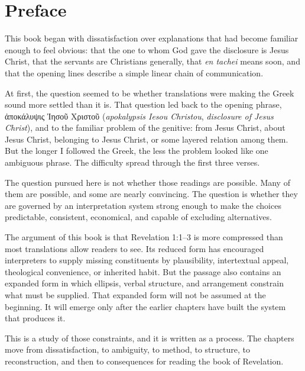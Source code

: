 \chapter{Preface}

This book began with dissatisfaction over explanations that had become familiar enough to feel obvious: that the one to whom God gave the disclosure is Jesus Christ, that the servants are Christians generally, that \textit{en tachei} means soon, and that the opening lines describe a simple linear chain of communication.

At first, the question seemed to be whether translations were making the Greek sound more settled than it is. That question led back to the opening phrase, \textgreek{ἀποκάλυψις Ἰησοῦ Χριστοῦ} (\textit{apokalypsis Iesou Christou}, \textit{disclosure of Jesus Christ}), and to the familiar problem of the genitive: from Jesus Christ, about Jesus Christ, belonging to Jesus Christ, or some layered relation among them. But the longer I followed the Greek, the less the problem looked like one ambiguous phrase. The difficulty spread through the first three verses.

The question pursued here is not whether those readings are possible. Many of them are possible, and some are nearly convincing. The question is whether they are governed by an interpretation system strong enough to make the choices predictable, consistent, economical, and capable of excluding alternatives.

The argument of this book is that Revelation 1:1--3 is more compressed than most translations allow readers to see. Its reduced form has encouraged interpreters to supply missing constituents by plausibility, intertextual appeal, theological convenience, or inherited habit. But the passage also contains an expanded form in which ellipsis, verbal structure, and arrangement constrain what must be supplied. That expanded form will not be assumed at the beginning. It will emerge only after the earlier chapters have built the system that produces it.

This is a study of those constraints, and it is written as a process. The chapters move from dissatisfaction, to ambiguity, to method, to structure, to reconstruction, and then to consequences for reading the book of Revelation.
